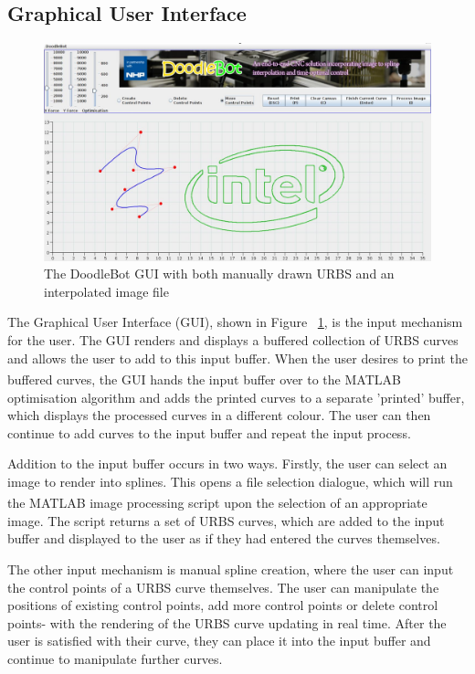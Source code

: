 \subsection{Graphical User Interface}

\begin{figure}[h]
	\centering
	\includegraphics[width=\textwidth]{figures/implementation/interface.jpg}
	\caption[The DoodleBot GUI]{The DoodleBot GUI with both manually drawn URBS and an interpolated image file}
	\label{fig:guiscreen}
\end{figure}

The Graphical User Interface (GUI), shown in Figure ~\ref{fig:guiscreen}, is the input mechanism for the user. The GUI renders and displays a buffered collection of URBS curves and allows the user to add to this input buffer. When the user desires to print the buffered curves, the GUI hands the input buffer over to the MATLAB\textsuperscript{\textregistered} optimisation algorithm and adds the printed curves to a separate 'printed' buffer, which displays the processed curves in a different colour. The user can then continue to add curves to the input buffer and repeat the input process.

Addition to the input buffer occurs in two ways. Firstly, the user can select an image to render into splines. This opens a file selection dialogue, which will run the MATLAB\textsuperscript{\textregistered} image processing script upon the selection of an appropriate image. The script returns a set of URBS curves, which are added to the input buffer and displayed to the user as if they had entered the curves themselves.

The other input mechanism is manual spline creation, where the user can input the control points of a URBS curve themselves. The user can manipulate the positions of existing control points, add more control points or delete control points- with the rendering of the URBS curve updating in real time. After the user is satisfied with their curve, they can place it into the input buffer and continue to manipulate further curves.

